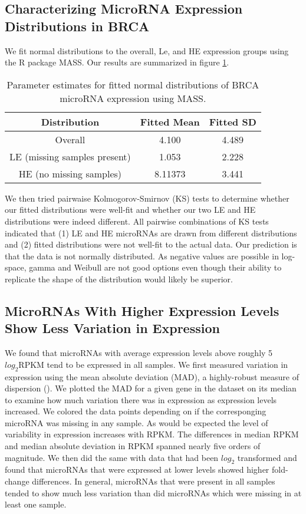 \documentclass[12pt]{report}
\begin{document}
\subsection*{Characterizing MicroRNA Expression Distributions in BRCA}
  We fit normal distributions to the overall, Le, and HE expression groups using the R package MASS. Our results are summarized in figure \ref{fig::fitted_tabular}.
  
  \begin{table}[H]
  \centering
   \caption{Parameter estimates for fitted normal distributions of BRCA microRNA expression using MASS.}
   \begin{tabular}[]{| c | c | c |}
   \hline
    Distribution & Fitted Mean & Fitted SD\\
    \hline 
    Overall& 4.100 & 4.489\\
    \hline
    LE (missing samples present)& 1.053 & 2.228\\
    \hline
    HE (no missing samples) & 8.11373 & 3.441\\
    \hline
   \end{tabular}
  
   \label{fig::fitted_tabular}
  \end{table}

  We then tried pairwaise Kolmogorov-Smirnov (KS) tests to determine whether our fitted distributions were well-fit and whether our two LE and HE distributions were indeed different. All pairwise combinations of KS tests
  indicated that (1) LE and HE microRNAs are drawn from different distributions and (2) fitted distributions were not well-fit to the actual data. Our prediction is that the data is not normally distributed. As negative
  values are possible in log-space, gamma and Weibull are not good options even though their ability to replicate the shape of the distribution would likely be superior.


\subsection*{MicroRNAs With Higher Expression Levels Show Less Variation in Expression}
  We found that microRNAs with average expression levels above roughly 5 $log_{2} \text{RPKM}$ tend to be expressed in all samples. We first measured variation in expression
  using the mean absolute deviation (MAD), a highly-robust measure of dispersion (). We plotted the MAD for a given gene in the dataset on its median to examine how much variation there was in
  expression as expression levels increased. We colored the data points depending on if the corresponging microRNA was missing in any sample.
  As would be expected the level of variability in expression increases with RPKM. The differences in median RPKM and median absolute deviation in RPKM spanned nearly five orders of magnitude. 
  We then did the same with data that had been $log_{2}$ transformed
  and found that microRNAs that were expressed at lower levels showed higher fold-change differences. In general, microRNAs that were present in all samples
  tended to show much less variation than did microRNAs which were missing in at least one sample.
  
\end{document}
